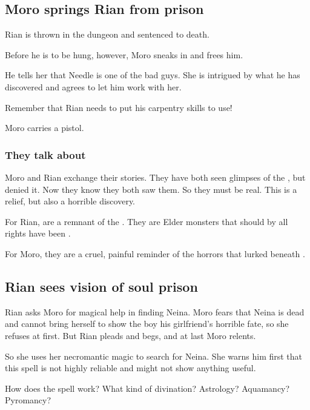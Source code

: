 \subsection{Moro springs Rian from prison}
Rian is thrown in the dungeon and sentenced to death. 

Before he is to be hung, however, Moro \Cobrel{} sneaks in and frees him. 

He tells her that Needle is one of the bad guys. 
She is intrigued by what he has discovered and agrees to let him work with her. 

Remember that Rian needs to put his carpentry skills to use! 

Moro carries a pistol. 





\subsubsection{They talk about \quiljaaran}
Moro and Rian exchange their stories. 
They have both seen glimpses of the , but denied it.
Now they know they both saw them. 
So they must be real. 
This is a relief, but also a horrible discovery.

For Rian, \quiljaaran are a remnant of the .
They are Elder monsters that should by all rights have been . 

For Moro, they are a cruel, painful reminder of the horrors that lurked beneath \Yormis. 










\subsection{Rian sees vision of soul prison}
Rian asks Moro \Cobrel{} for magical help in finding Neina. Moro fears that Neina is dead and cannot bring herself to show the boy his girlfriend's horrible fate, so she refuses at first. But Rian pleads and begs, and at last Moro relents. 

So she uses her necromantic magic to search for Neina. She warns him first that this spell is not highly reliable and might not show anything useful. 

How does the spell work? What kind of divination? Astrology? Aquamancy? Pyromancy? 


